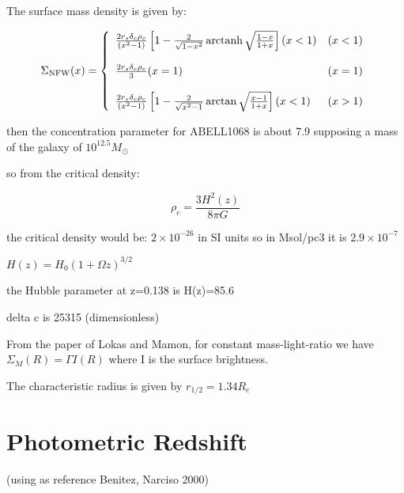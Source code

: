 The surface mass density is given by:

\begin{equation}
\Sigma_{\text{NFW}}(x) = \left\lbrace
\begin{array}{lll}
\frac{2r_{s}\delta_{c}\rho_{c}}{\left(x^{2}-1\right)}\left[1-\frac{2}{\sqrt{1-x^{2}}}\operatorname{arctanh}\sqrt{\frac{1-x}{1+x}}\right](x<1) & (x<1)\\\\
\frac{2r_{s}\delta_{c}\rho_{c}}{3}(x=1) & (x=1)\\\\
\frac{2r_{s}\delta_{c}\rho_{c}}{\left(x^{2}-1\right)}\left[1-\frac{2}{\sqrt{x^{2}-1}}\arctan\sqrt{\frac{x-1}{1+x}}\right](x<1) & (x>1)
\end{array}
\right.
\end{equation} 

then the concentration parameter for ABELL1068 is about 7.9 supposing a mass of the galaxy of $10^{12.5}M_{\odot}$

so from the critical density:

\begin{equation}
\rho_{c}=\frac{3H^2(z)}{8\pi G}
\end{equation}

the critical density would be: $2\times 10^{-26}$ in SI units so in Msol/pc3 it is $2.9\times 10^{-7}$

$H(z)=H_{0}(1+\Omega z)^{3/2}$

the Hubble parameter at z=0.138 is H(z)=85.6

delta c is 25315 (dimensionless)

From the paper of Lokas and Mamon, for constant mass-light-ratio we have $\Sigma_{M}(R)=\Gamma I(R)$ where I is the surface brightness.

The characteristic radius is given by $r_{1/2}=1.34R_{e}$


\section{Photometric Redshift}

(using as reference Benitez, Narciso 2000)
 
 